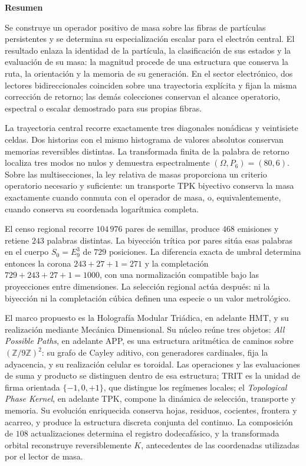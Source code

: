\begin{center}\bfseries Resumen\end{center}
\begingroup
\fontsize{9.3}{10.4}\selectfont
\setlength{\parskip}{1.5pt plus .5pt minus .5pt}
\noindent
Se construye un operador positivo de masa sobre las fibras de partículas
persistentes y se determina su especialización escalar para el electrón
central. El resultado enlaza la identidad de la partícula, la clasificación
de sus estados y la evaluación de su masa: la magnitud procede de una
estructura que conserva la ruta, la orientación y la memoria de su
generación. En el sector electrónico, dos lectores bidireccionales
coinciden sobre una trayectoria explícita y fijan la misma corrección de
retorno; las demás colecciones conservan el alcance operatorio, espectral o
escalar demostrado para sus propias fibras.

La trayectoria central recorre exactamente tres diagonales nonádicas y
veintisiete celdas. Dos historias con el mismo histograma de valores absolutos
conservan memorias reversibles distintas. La transformada finita de la palabra
de retorno localiza tres modos no nulos y demuestra espectralmente
$(\Omega,P_6)=(80,6)$. Sobre las multisecciones, la ley relativa de masas
proporciona un criterio operatorio necesario y suficiente: un transporte TPK
biyectivo conserva la masa exactamente cuando conmuta con el operador de masa,
o, equivalentemente, cuando conserva su coordenada logarítmica completa.

El censo regional recorre \(104\,976\) pares de semillas, produce \(468\)
emisiones y retiene \(243\) palabras distintas. La biyección trítica por pares
sitúa esas palabras en el cuerpo \(S_0=E_9^3\) de \(729\) posiciones. La
diferencia exacta de umbral determina entonces la corona
\(243+27+1=271\) y la completación
\(729+243+27+1=1000\), con una normalización compatible bajo las proyecciones
entre dimensiones. La selección regional actúa después: ni la biyección ni
la completación cúbica definen una especie o un valor metrológico.

El marco propuesto es la Holografía Modular Triádica, en adelante HMT, y
su realización mediante Mecánica Dimensional. Su núcleo reúne tres objetos:
\emph{All Possible Paths}, en adelante APP, es una estructura aritmética
de caminos sobre \((\mathbb Z/9\mathbb Z)^2\): su grafo de Cayley aditivo,
con generadores cardinales, fija la adyacencia, y su realización celular
es toroidal. Las operaciones y las evaluaciones de suma y producto se
distinguen dentro de esa estructura;
TRIT es la unidad de firma orientada \(\{-1,0,+1\}\), que distingue los
regímenes locales; el \emph{Topological Phase Kernel}, en adelante TPK,
compone la dinámica de selección, transporte y memoria. Su evolución
enriquecida conserva hojas, residuos, cocientes, frontera y acarreo, y
produce la estructura discreta conjunta del continuo. La composición de
\(108\) actualizaciones determina el registro dodecafásico, y la transformada
orbital reconstruye reversiblemente \(K\), antecedentes de las coordenadas utilizadas por el lector
de masa.

